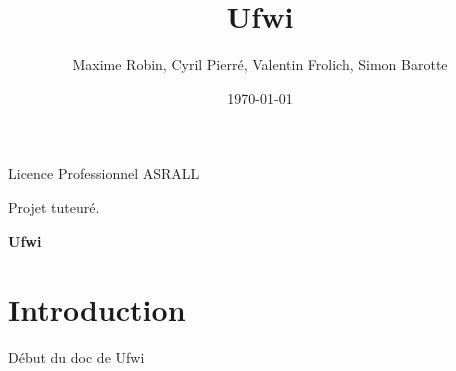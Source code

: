 \documentclass[12pt]{report}
\title{Ufwi}
\author{Maxime Robin, Cyril Pierré, Valentin Frolich, Simon Barotte}
\date{\today}
\begin{document}
\thispagestyle{empty}
\begin{center}
Licence Professionnel ASRALL


Projet tuteuré.

\vspace{2,5cm}
\textbf{\Huge Ufwi}


\end{center}



\newpage

\renewcommand{\contentsname}{Sommaire}
\tableofcontents

\newpage

\chapter{Introduction}
Début du doc de Ufwi

\end{document}
